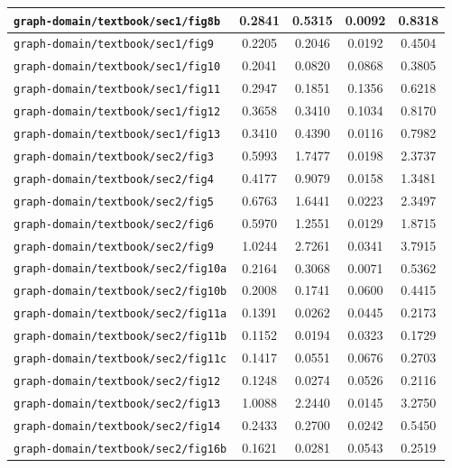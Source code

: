 \begin{longtable}{|p{6.5cm}|c|c|c|c|}
    \texttt{graph-domain/textbook/sec1/fig8b} & 0.2841 & 0.5315 & 0.0092 & 0.8318 \\ \hline
    \texttt{graph-domain/textbook/sec1/fig9} & 0.2205 & 0.2046 & 0.0192 & 0.4504 \\ \hline
    \texttt{graph-domain/textbook/sec1/fig10} & 0.2041 & 0.0820 & 0.0868 & 0.3805 \\ \hline
    \texttt{graph-domain/textbook/sec1/fig11} & 0.2947 & 0.1851 & 0.1356 & 0.6218 \\ \hline
    \texttt{graph-domain/textbook/sec1/fig12} & 0.3658 & 0.3410 & 0.1034 & 0.8170 \\ \hline
    \texttt{graph-domain/textbook/sec1/fig13} & 0.3410 & 0.4390 & 0.0116 & 0.7982 \\ \hline
    \texttt{graph-domain/textbook/sec2/fig3} & 0.5993 & 1.7477 & 0.0198 & 2.3737 \\ \hline
    \texttt{graph-domain/textbook/sec2/fig4} & 0.4177 & 0.9079 & 0.0158 & 1.3481 \\ \hline
    \texttt{graph-domain/textbook/sec2/fig5} & 0.6763 & 1.6441 & 0.0223 & 2.3497 \\ \hline
    \texttt{graph-domain/textbook/sec2/fig6} & 0.5970 & 1.2551 & 0.0129 & 1.8715 \\ \hline
    \texttt{graph-domain/textbook/sec2/fig9} & 1.0244 & 2.7261 & 0.0341 & 3.7915 \\ \hline
    \texttt{graph-domain/textbook/sec2/fig10a} & 0.2164 & 0.3068 & 0.0071 & 0.5362 \\ \hline
    \texttt{graph-domain/textbook/sec2/fig10b} & 0.2008 & 0.1741 & 0.0600 & 0.4415 \\ \hline
    \texttt{graph-domain/textbook/sec2/fig11a} & 0.1391 & 0.0262 & 0.0445 & 0.2173 \\ \hline
    \texttt{graph-domain/textbook/sec2/fig11b} & 0.1152 & 0.0194 & 0.0323 & 0.1729 \\ \hline
    \texttt{graph-domain/textbook/sec2/fig11c} & 0.1417 & 0.0551 & 0.0676 & 0.2703 \\ \hline
    \texttt{graph-domain/textbook/sec2/fig12} & 0.1248 & 0.0274 & 0.0526 & 0.2116 \\ \hline
    \texttt{graph-domain/textbook/sec2/fig13} & 1.0088 & 2.2440 & 0.0145 & 3.2750 \\ \hline
    \texttt{graph-domain/textbook/sec2/fig14} & 0.2433 & 0.2700 & 0.0242 & 0.5450 \\ \hline
    \texttt{graph-domain/textbook/sec2/fig16b} & 0.1621 & 0.0281 & 0.0543 & 0.2519 \\ \hline

\end{longtable}

